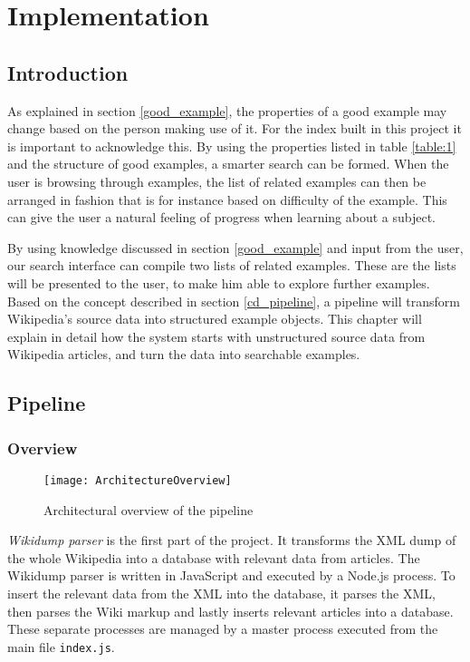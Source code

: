 
\chapter{Implementation}\label{cap_4}

\section{Introduction}

As explained in section \ref{good_example}, the properties of a good example may change based on the person making use of it. For the index built in this project it is important to acknowledge this. By using the properties listed in table \ref{table:1} and the structure of good examples, a smarter search can be formed. When the user is browsing through examples, the list of related examples can then be arranged in fashion that is for instance based on difficulty of the example. This can give the user a natural feeling of progress when learning about a subject.

By using knowledge discussed in section \ref{good_example} and input from the user, our search interface can compile two lists of related examples. These are the lists will be presented to the user, to make him able to explore further examples. Based on the concept described in section \ref{cd_pipeline}, a pipeline will transform Wikipedia's source data into structured example objects. This chapter will explain in detail how the system starts with unstructured source data from Wikipedia articles, and turn the data into searchable examples.

\section{Pipeline}

\subsection{Overview}

\begin{figure}[h]
\caption{Architectural overview of the pipeline}
\texttt{[image: ArchitectureOverview]}
\label{fig:pipeline_arch}
\end{figure}


\textit{Wikidump parser} is the first part of the project. It transforms the XML dump of the whole Wikipedia into a database with relevant data from articles. The Wikidump parser is written in JavaScript and executed by a Node.js process. To insert the relevant data from the XML into the database, it parses the XML, then parses the Wiki markup and lastly inserts relevant articles into a database. These separate processes are managed by a master process executed from the main file \texttt{index.js}.

